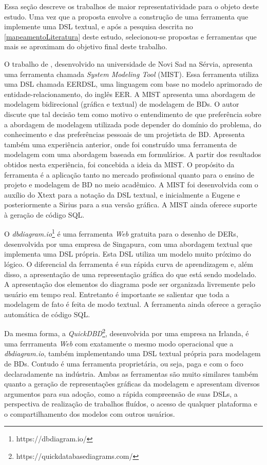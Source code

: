 Essa seção descreve os trabalhos de maior representatividade para o objeto deste estudo. 
Uma vez que a proposta envolve a construção de uma ferramenta que implemente uma \ac{DSL} textual, e após a pesquisa descrita no \autoref{mapeamentoLiteratura} deste estudo, selecionou-se propostas e ferramentas que mais se aproximam do objetivo final deste trabalho.

O trabalho de , desenvolvido na universidade de Novi Sad na Sérvia, apresenta uma ferramenta chamada \textit{System Modeling Tool} (MIST). 
Essa ferramenta utiliza uma \ac{DSL} chamada EERDSL, uma linguagem com base no modelo aprimorado de entidade-relacionamento, do inglês \ac{EER}.
A MIST apresenta uma abordagem de modelagem bidirecional (gráfica e textual) de modelagem de \acp{BD}. 
O autor discute que tal decisão tem como motivo o entendimento de que preferência sobre a abordagem de modelagem utilizada pode depender do domínio do problema, do conhecimento e das preferências pessoais de um projetista de \ac{BD}. 
Apresenta também uma experiência anterior, onde foi construído uma ferramenta de modelagem com uma abordagem baseada em formulários. 
A partir dos resultados obtidos nesta experiência, foi concebida a ideia da MIST. 
O propósito da ferramenta é a aplicação tanto no mercado profissional quanto para o ensino de projeto e modelagem de \ac{BD} no meio acadêmico. 
A MIST foi desenvolvida com o auxílio do Xtext para a notação da \ac{DSL} textual, e inicialmente a Eugene e posteriormente a Sirius para a sua versão gráfica. 
A MIST ainda oferece suporte à geração de código \ac{SQL}.

O \textit{dbdiagram.io}\footnote{https://dbdiagram.io/} é uma ferramenta \textit{Web} gratuita para o desenho de \acp{DER}, desenvolvida por uma empresa de Singapura, com uma abordagem textual que implementa uma \ac{DSL} própria.
Esta \ac{DSL} utiliza um modelo muito próximo do lógico. 
O diferencial da ferramenta é sua rápida curva de aprendizagem e, além disso, a apresentação de uma representação gráfica do que está sendo modelado.
A apresentação dos elementos do diagrama pode ser organizada livremente pelo usuário em tempo real. 
Entretanto é importante se salientar que toda a modelagem de fato é feita de modo textual. 
A ferramenta ainda oferece a geração automática de código \ac{SQL}.

Da mesma forma, a \textit{QuickDBD}\footnote{https://quickdatabasediagrams.com/}, desenvolvida por uma empresa na Irlanda, é uma ferrramenta \textit{Web} com exatamente o mesmo modo operacional que a \textit{dbdiagram.io}, também implementando uma \ac{DSL} textual própria para modelagem de \acp{BD}.
Contudo é uma ferramenta proprietária, ou seja, paga e com o foco declaradamente na indústria. 
Ambas as ferramentas são muito similares também quanto a geração de representações gráficas da modelagem e apresentam diversos argumentos para sua adoção, como a rápida compreensão de suas \acp{DSL}, a perspectiva de realização de trabalhos fluídos, o acesso de qualquer plataforma e o compartilhamento dos modelos com outros usuários.

